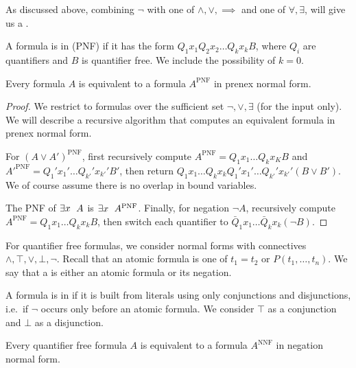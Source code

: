 As discussed above, combining $\lnot$ with one of $\land, \lor, \implies$ and
one of $\forall, \exists$, will give us a .


A formula is in  (PNF) if it has the form $Q_1 x_1 Q_2
x_2 \ldots Q_k x_k B$, where $Q_i$ are quantifiers and $B$ is quantifier free.
We include the possibility of $k = 0$.

\begin{proposition}
  Every formula $A$ is equivalent to a formula $A^{\text{PNF}}$ in prenex normal
  form.
\end{proposition}

\begin{proof}
  We restrict to formulas over the sufficient set $\lnot, \lor, \exists$ (for
  the input only).
  We will describe a recursive algorithm that computes an equivalent formula in
  prenex normal form.

  For $(A \lor A')^{\text{PNF}}$, first recursively compute $A^{\text{PNF}} = Q_1 x_1
  \ldots Q_k x_K B$ and $A'^{\text{PNF}} = Q_1' x_1' \ldots Q_{k'}' x_{k'}' B'$,
  then return $Q_1 x_1 \ldots Q_k x_k Q_1' x_1' \ldots Q_{k'}' x_{k'}' (B \lor
  B')$.
  We of course assume there is no overlap in bound variables.

  The PNF of $\exists x \;\  A$ is $\exists x \;\  A^{\text{PNF}}$.
  Finally, for negation $\lnot A$, recursively compute $A^{\text{PNF}} = Q_1 x_1
  \ldots Q_k x_k B$, then switch each quantifier to $\bar{Q}_1 x_1 \ldots
  \bar{Q}_k x_k (\lnot B)$.
\end{proof}

For quantifier free formulas, we consider normal forms with connectives $\land,
\top, \lor, \bot, \lnot$.
Recall that an atomic formula is one of $t_1 = t_2$ or $P(t_1, \ldots, t_n)$.
We say that a  is either an atomic formula or its negation.

A formula is in  if it is built from literals
using only conjunctions and disjunctions, i.e.~if $\lnot$ occurs only before an
atomic formula.
We consider $\top$ as a conjunction and $\bot$ as a disjunction.

\begin{proposition}
  Every quantifier free formula $A$ is equivalent to a formula $A^{\text{NNF}}$
  in negation normal form.
\end{proposition}

